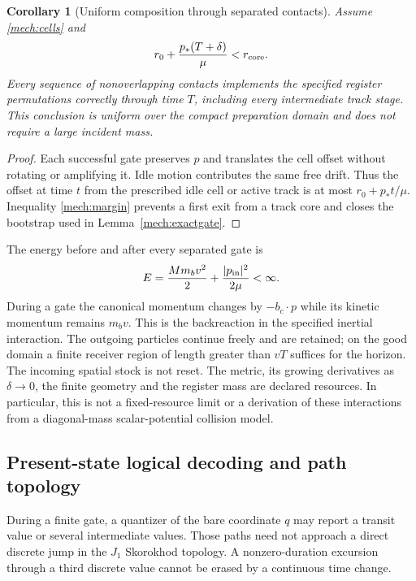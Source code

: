 \documentclass[11pt]{article}
\newtheorem{corollary}[theorem]{Corollary}
\theoremstyle{definition}\newtheorem{definition}[theorem]{Definition}
\theoremstyle{remark}\newtheorem{remark}[theorem]{Remark}
\begin{document}
\begin{corollary}[Uniform composition through separated contacts]
\label{mech:robust}
Assume \eqref{mech:cells} and
\begin{equation}\label{mech:margin}
 r_0+\frac{p_*(T+\delta)}{\mu}<r_{\rm core}.
\end{equation}
Every sequence of nonoverlapping contacts implements the specified register
permutations correctly through time $T$, including every intermediate track
stage. This conclusion is uniform over the compact preparation domain and
does not require a large incident mass.
\end{corollary}
\begin{proof}
Each successful gate preserves $p$ and translates the cell offset without
rotating or amplifying it. Idle motion contributes the same free drift.
Thus the offset at time $t$ from the prescribed idle cell or active track
is at most $r_0+p_*t/\mu$. Inequality \eqref{mech:margin} prevents a first
exit from a track core and closes the bootstrap used in
Lemma~\ref{mech:exactgate}.
\end{proof}

The energy before and after every separated gate is
\begin{equation}\label{mech:energy}
 E=\frac{Mm_bv^2}{2}+\frac{|p_{\rm in}|^2}{2\mu}<\infty.
\end{equation}
During a gate the canonical momentum changes by $-b_c\cdot p$ while its
kinetic momentum remains $m_bv$. This is the backreaction in the specified
inertial interaction. The outgoing particles continue freely and are retained;
on the good domain a finite receiver region of length greater than $vT$
suffices for the horizon. The incoming spatial stock is not reset.
The metric, its growing derivatives as $\delta\to0$, the finite geometry and
the register mass are declared resources. In particular, this is not a
fixed-resource limit or a derivation of these interactions from a
diagonal-mass scalar-potential collision model.

\subsection{Present-state logical decoding and path topology}

During a finite gate, a quantizer of the bare coordinate $q$ may report a
transit value or several intermediate values. Those paths need not approach
a direct discrete jump in the $J_1$ Skorokhod topology. A nonzero-duration
excursion through a third discrete value cannot be erased by a continuous
time change.
\end{document}

